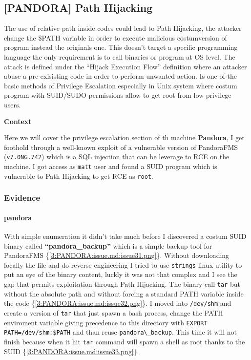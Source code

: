 \documentclass[a4paper]{article}
\newcommand{\passthrough}[1]{\colorbox{code}{\lstset{mathescape=false}#1}}
\begin{document}
    \clearpage

    

      \newpage
    
    \subsection{[PANDORA] Path Hijacking}
    \label{3:PANDORA:issue.md}

    The use of relative path inside codes could lead to Path Hijacking, the attacker change the \$PATH variable in order
to execute malicious costumversion of program instead the originals one. This doesn't target a specific programming language the
only requirement is to call binaries or program at OS level. The attack is defined under the ``Hijack Execution Flow'' definition where
an attacker abuse a pre-exisisting code in order to perform unwanted action. Is one of the basic methods of Privilege Escalation especially
in Unix system where costum program with SUID/SUDO permissions allow to get root from low privilege users.

\textbf{Context}

Here we will cover the privilege escalation section of th machine \textbf{Pandora}, I get foothold through a well-known exploit of a vulnerable
version of PandoraFMS (\passthrough{\lstinline!v7.0NG.742!}) which is a SQL injection that can be leverage to RCE on the machine. I got access as \passthrough{\lstinline!matt!} user
and found a SUID program which is vulnerable to Path Hijacking to get RCE as \passthrough{\lstinline!root!}.


    \subsubsection{Evidence}

          \paragraph{pandora}

      With simple enumeration it didn't take much before I discovered a costum SUID binary called \textbf{``pandora\_backup''} which is a simple backup
tool for PandoraFMS \{\ref{3:PANDORA:issue.md:issue31.png}\}. Without downloading locally the file and do reverse engineering I tried to use
\passthrough{\lstinline!strings!} linux utility to put an eye of the binary content, luckly it was not that complex and I see the gap that permits exploitation through
Path Hijacking. The binary call \passthrough{\lstinline!tar!} but without the absolute path and without forcing a standard PATH variable inside the code \{\ref{3:PANDORA:issue.md:issue32.png}\}.
I moved into \passthrough{\lstinline!/dev/shm!} and create a version of \passthrough{\lstinline!tar!} that just spawn a bash process, change the PATH enviroment variable giving precedence to this directory
with \passthrough{\lstinline!EXPORT PATH=/dev/shm:$PATH!} and than reuse \passthrough{\lstinline!pandora\_backup!}. This time it will not finish because when it hit \passthrough{\lstinline!tar!} command will spawn a shell as root thanks
to the SUID \{\ref{3:PANDORA:issue.md:issue33.png}\}.
\end{document}
